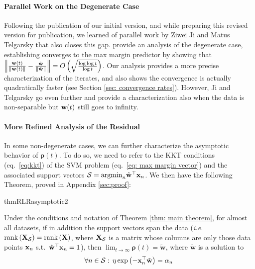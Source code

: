 \documentclass[twoside,11pt,english]{article}
\newcommand{\norm}[1]{\left\lVert{#1}\right\rVert}
\begin{document}
\paragraph{Parallel Work on the Degenerate Case} Following the publication of our initial version, and while preparing this revised version for publication, we learned of parallel work by Ziwei Ji and Matus Telgarsky that also closes this gap.  \cite{Ji2018}  provide an analysis of the degenerate case, establishing converges to the max margin predictor by showing that $\norm{ \frac{\w(t)}{\norm{\w(t)}} - \frac{\what}{\norm{\what}}}=O\left(\sqrt{\frac{\log \log t}{\log t}}\right)$.  Our analysis provides a more precise characterization of the iterates, and also shows the convergence is actually quadratically faster (see Section \ref{sec: convergence rates}).  However, Ji and Telgarsky go even further and provide a characterization also when the data is non-separable but $\mathbf{w}(t)$ still goes to infinity.

\paragraph{More Refined Analysis of the Residual}

In some non-degenerate cases, we can further characterize the asymptotic behavior of $\boldsymbol{\rho}\left(t\right)$.  To do so, we need to refer to the KKT conditions (eq.~\ref{eq:kkt})
of the SVM problem (eq.~\ref{eq: max margin vector}) and the associated
support vectors $\mathcal{S}=\mathrm{argmin}_{n}\hat{\mathbf{w}}^{\top}\mathbf{x}_{n}$.  We then have the following Theorem, 
proved in Appendix \ref{sec:proof}:

\begin{restatable}{thmR}{LRasymptotic2}

\label{thm: refined Theorem} Under the conditions and notation of
Theorem \ref{thm: main theorem}, for almost all datasets, if in addition the support vectors
span the data (\emph{i.e.}~$\mathrm{rank}\left(\mathbf{X}_{\mathcal{S}}\right)=\mathrm{rank}\left(\mathbf{X}\right)$, 
where $\mathbf{X}_{\mathcal{S}}$ is a matrix whose columns are only those data points $\mathbf{x}_n$ s.t.~$\hat{\mathbf{w}}^\top\mathbf{x}_n=1$), then $\lim_{t\rightarrow\infty}\boldsymbol{\rho}\left(t\right)=\tilde{\mathbf{w}}$,
where $\tilde{\mathbf{w}}$ is a solution to 
\begin{equation}
\forall n\in\mathcal{S}:\,\eta\exp\left(-\mathbf{x}_{n}^{\top}\tilde{\mathbf{w}}\right)=\alpha_{n}\,\label{eq: w tilde}
\end{equation}

\end{restatable}
\end{document}
